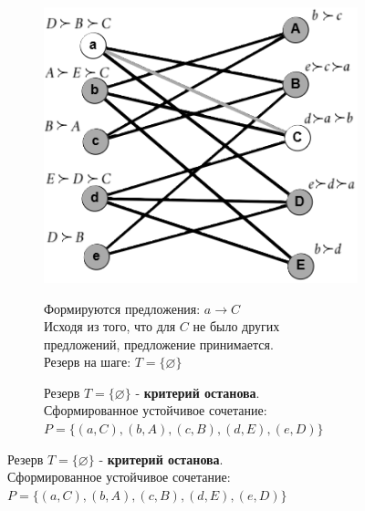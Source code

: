 \documentclass{article}
\begin{document}
\begin{enumerate}
\begin{figure}
\begin{subfigure}[b]{0.47\textwidth}
         \label{fig:to_bin_11_2}
     \end{subfigure}
          \hfill
    \begin{subfigure}[b]{0.47\textwidth}
        \centering
         \caption*{Формируются предложения: $a\rightarrow C$
         \\Исходя из того, что для $C$ не было других предложений, предложение принимается.\\
         Резерв на шаге: $T =\{\varnothing\}$}
         \includegraphics[width=\textwidth]{attachments/11/33.png}
         \label{fig:to_bin_11_3}
     \end{subfigure}
     \hfill
     \begin{subfigure}[b]{0.47\textwidth}
        \centering
         \caption*{Резерв $T =\{\varnothing\}$ - \textbf{критерий останова}.\\
         Сформированное устойчивое сочетание:\\
         $P = \{(a,C),(b,A),(c,B),(d,E),(e,D)\}$
         }

\end{subfigure}
\end{figure}
\end{enumerate}
\end{document}
